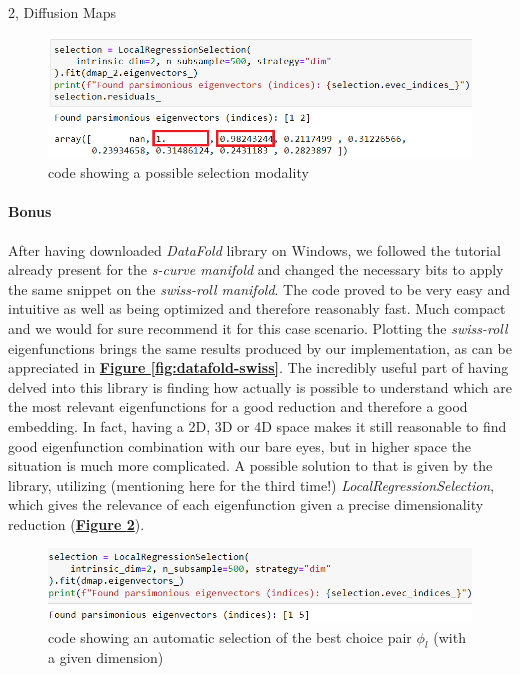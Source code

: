 \documentclass[10pt,a4paper]{article}
\begin{document}
\begin{task}{2, Diffusion Maps}
\begin{figure}[H]
    \centering
    \includegraphics[scale=0.7]{images/ped_choose.png}
    \caption{code showing a possible selection modality}
    \label{fig:ped-code}
\end{figure}

\pagebreak 
\paragraph{Bonus}
After having downloaded \textit{DataFold} library on Windows, we followed the tutorial already present for the \textit{s-curve manifold} and changed the necessary bits to apply the same snippet on the \textit{swiss-roll manifold}. The code proved to be very easy and intuitive as well as being optimized and therefore reasonably fast. Much compact and we would for sure recommend it for this case scenario. Plotting the \textit{swiss-roll} eigenfunctions brings the same results produced by our implementation, as can be appreciated in \textbf{\hyperref[fig:datafold-swiss]{Figure \ref{fig:datafold-swiss}}}. The incredibly useful part of having delved into this library is finding how actually is possible to understand which are the most relevant eigenfunctions for a good reduction and therefore a good embedding. In fact, having a 2D, 3D or 4D space makes it still reasonable to find good eigenfunction combination with our bare eyes, but in higher space the situation is much more complicated. A possible solution to that is given by the library, utilizing (mentioning here for the third time!) \textit{LocalRegressionSelection}, which gives the relevance of each eigenfunction given a precise dimensionality reduction (\textbf{\hyperref[fig:datafold-code]{Figure \ref{fig:datafold-code}}}).

\begin{figure}[H]
    \centering
    \includegraphics[scale=0.7]{images/datafold-code.png}
    \caption{code showing an automatic selection of the best choice pair $\phi_l$ (with a given dimension)}
    \label{fig:datafold-code}
\end{figure}


\end{task}
\end{document}
